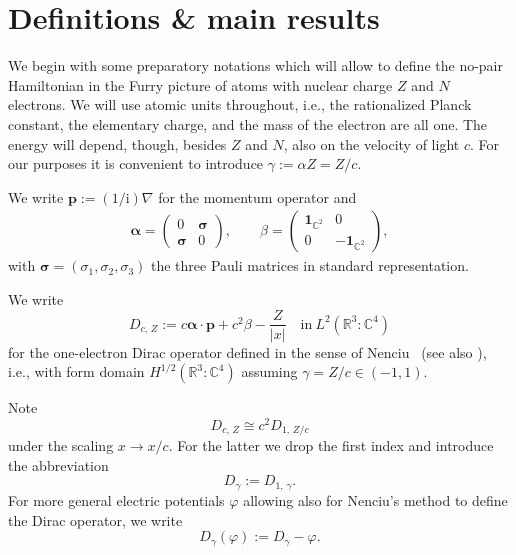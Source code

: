 \documentclass[AHL,Unicode,longabstracts,published]{cedram}
\newcommand*\ri{\mathrm{i}}
\newcommand*\cz{\mathbb{C}}
\newcommand*\rz{\mathbb{R}}
\newcommand{\one}{\mathbf{1}}
\newcommand*\balpha{\bm{\alpha}}
\newcommand*\bsigma{\bm{\sigma}}
\newcommand*\bp{\bm{p}}
\begin{document}
\section{Definitions \& main results}\label{s:defresults}
We begin with some preparatory notations which will allow to define the no-pair Hamiltonian in the Furry picture of atoms with nuclear charge $Z$ and $N$ electrons. We will use atomic units throughout, i.e., the rationalized Planck constant, the elementary charge, and the mass of the electron are all one. The energy will depend, though, besides $Z$ and $N$, also on the velocity of light $c$. For our purposes it is convenient to introduce $\gamma:=\alpha Z=Z/c$.

We write $\bp:=(1/\ri)\nabla$ for the momentum operator and
\begin{align*}
\balpha=\left(
\begin{matrix}
0 & \bsigma\\
\bsigma & 0
\end{matrix}\right),\qquad
\beta=\left(
\begin{matrix}
\one_{\cz^2} & 0\\
0 & -\one_{\cz^2}
\end{matrix}\right),
\end{align*}
with $\bsigma=(\sigma_1,\sigma_2,\sigma_3)$ the three Pauli matrices in standard representation.

We write
\begin{equation}\label{eq:defcoulombdirac}
D_{c,\,Z}:= c\balpha\cdot \bp+c^2\beta-\frac{Z}{|x|} \quad \text{in}\ L^2\left(\rz^3:\cz^4\right)
\end{equation}
for the one-electron Dirac operator defined in the sense of Nenciu~\cite{Nenciu1976} (see also \cite{KlausWust1978,Schmincke1972,Wust1975}), i.e., with form domain $H^{1/2}(\rz^3:\cz^4)$ assuming $\gamma=Z/c\in(-1,1)$.

Note
\begin{equation}\label{eq:cdrescaled}
D_{c,\,Z}\cong c^2D_{1,\,Z/c}
\end{equation}
under the scaling $x\to x/c$. For the latter we drop the first index and introduce the abbreviation
\begin{equation}\label{eq:dgamma}
D_\gamma:=D_{1,\,\gamma}.
\end{equation}
For more general electric potentials $\varphi$ allowing also for Nenciu's method to define the Dirac operator, we write
\begin{equation}\label{eq:dphi}
D_\gamma(\varphi):=D_\gamma-\varphi.
\end{equation}
\end{document}
